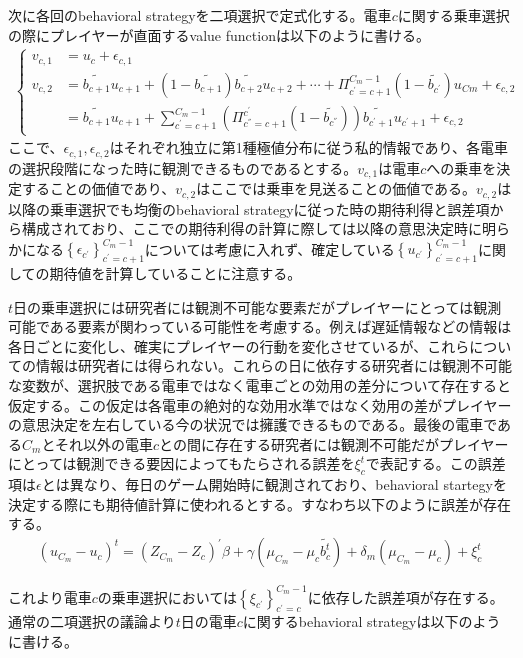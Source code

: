 \documentclass{jsarticle}
\begin{document}
次に各回のbehavioral strategyを二項選択で定式化する。電車$c$に関する乗車選択の際にプレイヤーが直面するvalue functionは以下のように書ける。
\begin{align*}
	\begin{cases}
	v_{c, 1} &= u_c + \epsilon_{c, 1}\\[8pt]
	v_{c, 2} &= \tilde{b_{c+1}} u_{c+1} + (1 - \tilde{b_{c+1}}) \tilde{b_{c+2}} u_{c+2} + \cdots + \Pi_{c^{'} = c+1}^{C_m-1}(1 - \tilde{b_{c^{'}}}) u_{Cm} + \epsilon_{c, 2}\\[8pt]
	&= \tilde{b_{c+1}} u_{c+1} + \sum_{c^{'}=c+1}^{C_m-1} \left( \Pi_{c^{''} = c+1}^{c^{'}} (1 - \tilde{b_{c^{''}}}) \right) \tilde{b_{c^{'} + 1}} u_{c^{'} + 1} + \epsilon_{c, 2}
	\end{cases}
\end{align*}
ここで、$\epsilon_{c, 1}, \epsilon_{c, 2}$はそれぞれ独立に第1種極値分布に従う私的情報であり、各電車の選択段階になった時に観測できるものであるとする。$v_{c, 1}$は電車$c$への乗車を決定することの価値であり、$v_{c, 2}$はここでは乗車を見送ることの価値である。$v_{c, 2}$は以降の乗車選択でも均衡のbehavioral strategyに従った時の期待利得と誤差項から構成されており、ここでの期待利得の計算に際しては以降の意思決定時に明らかになる$\left\{ \epsilon_{c^{'}} \right\}_{c^{'} = c+1}^{C_m-1}$については考慮に入れず、確定している$\left\{ u_{c^{'}} \right\}_{c^{'} = c+1}^{C_m-1}$に関しての期待値を計算していることに注意する。

$t$日の乗車選択には研究者には観測不可能な要素だがプレイヤーにとっては観測可能である要素が関わっている可能性を考慮する。例えば遅延情報などの情報は各日ごとに変化し、確実にプレイヤーの行動を変化させているが、これらについての情報は研究者には得られない。これらの日に依存する研究者には観測不可能な変数が、選択肢である電車ではなく電車ごとの効用の差分について存在すると仮定する。この仮定は各電車の絶対的な効用水準ではなく効用の差がプレイヤーの意思決定を左右している今の状況では擁護できるものである。最後の電車である$C_m$とそれ以外の電車$c$との間に存在する研究者には観測不可能だがプレイヤーにとっては観測できる要因によってもたらされる誤差を$\xi_c^t$で表記する。この誤差項は$\epsilon$とは異なり、毎日のゲーム開始時に観測されており、behavioral startegyを決定する際にも期待値計算に使われるとする。すなわち以下のように誤差が存在する。
\begin{align*}
	(u_{C_m} - u_c)^t = (Z_{C_m} - Z_c)^{'} \beta + \gamma (\mu_{C_m} - \mu_{c} \tilde{b_c^t}) + \delta_m (\mu_{C_m} - \mu_c) + \xi_c^t
\end{align*}

これより電車$c$の乗車選択においては$\left\{ \xi_{c^{'}} \right\}_{c^{'} = c}^{C_m-1}$に依存した誤差項が存在する。通常の二項選択の議論より$t$日の電車$c$に関するbehavioral strategyは以下のように書ける。
\end{document}
